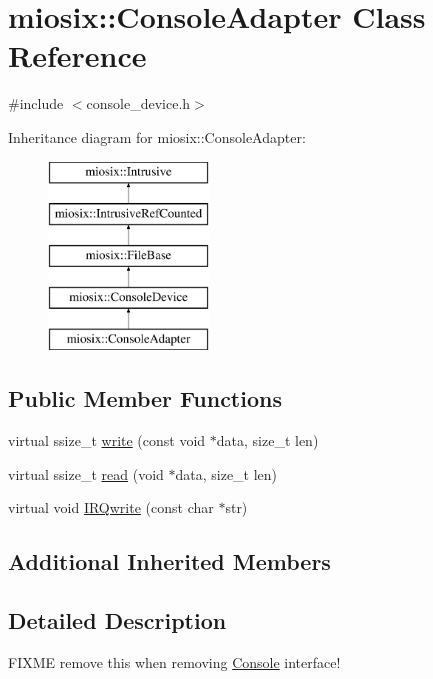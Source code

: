 \hypertarget{classmiosix_1_1_console_adapter}{\section{miosix\-:\-:Console\-Adapter Class Reference}
\label{classmiosix_1_1_console_adapter}
}


{\ttfamily \#include $<$console\-\_\-device.\-h$>$}

Inheritance diagram for miosix\-:\-:Console\-Adapter\-:\begin{figure}[H]
\begin{center}
\leavevmode
\includegraphics[height=5.000000cm]{classmiosix_1_1_console_adapter}
\end{center}
\end{figure}
\subsection*{Public Member Functions}
\begin{DoxyCompactItemize}
\item 
virtual ssize\-\_\-t \hyperlink{classmiosix_1_1_console_adapter_afbbc3113ba82ea99de45fe5fd0bc53f2}{write} (const void $\ast$data, size\-\_\-t len)
\item 
virtual ssize\-\_\-t \hyperlink{classmiosix_1_1_console_adapter_a6b9e9bd594b3725cce6761eaf5e9722e}{read} (void $\ast$data, size\-\_\-t len)
\item 
virtual void \hyperlink{classmiosix_1_1_console_adapter_a69f90d0638363783425d42a926325b98}{I\-R\-Qwrite} (const char $\ast$str)
\end{DoxyCompactItemize}
\subsection*{Additional Inherited Members}


\subsection{Detailed Description}
F\-I\-X\-M\-E remove this when removing \hyperlink{classmiosix_1_1_console}{Console} interface! 

